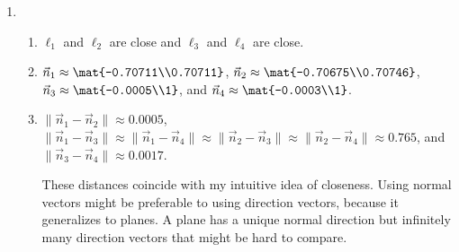 \begin{enumerate}
			\item \begin{enumerate}
				\item $\ell_1$ and $\ell_2$ are close and $\ell_3$ and $\ell_4$ are close.
				\item $\vec n_1\approx\mat{-0.70711\\0.70711}$,
					$\vec n_2\approx\mat{-0.70675\\0.70746}$,
					$\vec n_3\approx\mat{-0.0005\\1}$, and $\vec n_4\approx\mat{-0.0003\\1}$.
				\item
					$\|\vec n_1-\vec n_2\|\approx 0.0005$,
					$\|\vec n_1-\vec n_3\|\approx \|\vec n_1-\vec n_4\|
					\approx \|\vec n_2-\vec n_3\|\approx \|\vec n_2-\vec n_4\|\approx 0.765$,
					and
					$\|\vec n_3-\vec n_4\|\approx 0.0017$.

					These distances coincide with my intuitive idea of closeness. Using normal
					vectors might be preferable to using direction vectors, because it generalizes to
					planes. A plane has a unique
					normal direction but infinitely many direction vectors that might be hard to compare.
			\end{enumerate}
		\end{enumerate} 